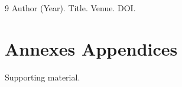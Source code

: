 \documentclass[11pt,a4paper]{article}
\newcommand{\bi}[2]{#1 \textperiodcentered{} #2}
\begin{document}
\renewcommand{\refname}{\bi{Bibliographie}{References}}
\begin{thebibliography}{9}
   Author (Year). Title. Venue. DOI.
\end{thebibliography}

\appendix
\section{\bi{Annexes}{Appendices}}
Supporting material.
\end{document}
